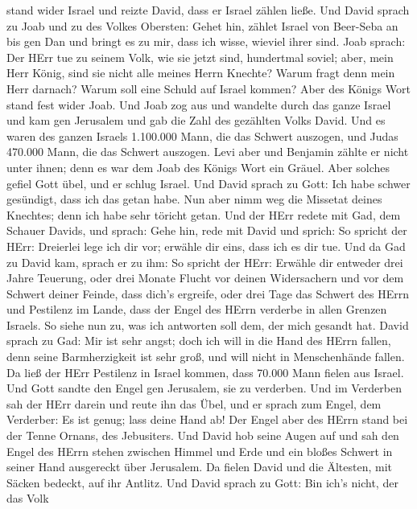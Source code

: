 stand wider Israel und reizte David, dass er Israel zählen ließe.
 Und David sprach zu Joab und zu des Volkes Obersten: Gehet
hin, zählet Israel von Beer-Seba an bis gen Dan und bringt es zu mir,
dass ich wisse, wieviel ihrer sind.  Joab sprach: Der HErr
tue zu seinem Volk, wie sie jetzt sind, hundertmal soviel; aber, mein
Herr König, sind sie nicht alle meines Herrn Knechte? Warum fragt denn
mein Herr darnach? Warum soll eine Schuld auf Israel kommen?
 Aber des Königs Wort stand fest wider Joab. Und Joab zog
aus und wandelte durch das ganze Israel und kam gen Jerusalem
 und gab die Zahl des gezählten Volks David. Und es waren
des ganzen Israels 1.100.000 Mann, die das Schwert auszogen, und Judas
470.000 Mann, die das Schwert auszogen.  Levi aber und
Benjamin zählte er nicht unter ihnen; denn es war dem Joab des Königs
Wort ein Gräuel.  Aber solches gefiel Gott übel, und er
schlug Israel.  Und David sprach zu Gott: Ich habe schwer
gesündigt, dass ich das getan habe. Nun aber nimm weg die Missetat
deines Knechtes; denn ich habe sehr töricht getan.  Und der
HErr redete mit Gad, dem Schauer Davids, und sprach:  Gehe
hin, rede mit David und sprich: So spricht der HErr: Dreierlei lege ich
dir vor; erwähle dir eins, dass ich es dir tue.  Und da Gad
zu David kam, sprach er zu ihm: So spricht der HErr: Erwähle dir
 entweder drei Jahre Teuerung, oder drei Monate Flucht vor
deinen Widersachern und vor dem Schwert deiner Feinde, dass dich's
ergreife, oder drei Tage das Schwert des HErrn und Pestilenz im Lande,
dass der Engel des HErrn verderbe in allen Grenzen Israels. So siehe nun
zu, was ich antworten soll dem, der mich gesandt hat. 
David sprach zu Gad: Mir ist sehr angst; doch ich will in die Hand des
HErrn fallen, denn seine Barmherzigkeit ist sehr groß, und will nicht in
Menschenhände fallen.  Da ließ der HErr Pestilenz in Israel
kommen, dass 70.000 Mann fielen aus Israel.  Und Gott
sandte den Engel gen Jerusalem, sie zu verderben. Und im Verderben sah
der HErr darein und reute ihn das Übel, und er sprach zum Engel, dem
Verderber: Es ist genug; lass deine Hand ab! Der Engel aber des HErrn
stand bei der Tenne Ornans, des Jebusiters.  Und David hob
seine Augen auf und sah den Engel des HErrn stehen zwischen Himmel und
Erde und ein bloßes Schwert in seiner Hand ausgereckt über Jerusalem. Da
fielen David und die Ältesten, mit Säcken bedeckt, auf ihr Antlitz.
 Und David sprach zu Gott: Bin ich's nicht, der das Volk
